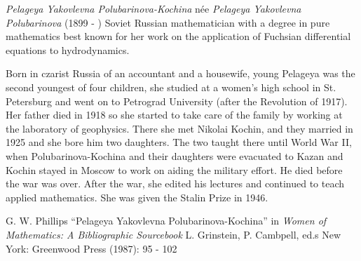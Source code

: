 \documentclass[12pt]{article}
\begin{document}
\emph{Pelageya Yakovlevna Polubarinova-Kochina} n\'ee \emph{Pelageya Yakovlevna Polubarinova} (1899 - ) Soviet Russian mathematician with a degree in pure mathematics best known for her work on the application of Fuchsian differential equations to hydrodynamics.

Born in czarist Russia of an accountant and a housewife, young Pelageya was the second youngest of four children, she studied at a women's high school in St. Petersburg and went on to Petrograd University (after the Revolution of 1917). Her father died in 1918 so she started to take care of the family by working at the laboratory of geophysics. There she met Nikolai Kochin, and they married in 1925 and she bore him two daughters. The two taught there until World War II, when Polubarinova-Kochina and their daughters were evacuated to Kazan and Kochin stayed in Moscow to work on aiding the military effort. He died before the war was over. After the war, she edited his lectures and continued to teach applied mathematics. She was given the Stalin Prize in 1946.

\begin{thebibliography}{1}
 G. W. Phillips ``Pelageya Yakovlevna Polubarinova-Kochina'' in {\it Women of Mathematics: A Bibliographic Sourcebook} L. Grinstein, P. Cambpell, ed.s New York: Greenwood Press (1987): 95 - 102
\end{thebibliography}
\end{document}
